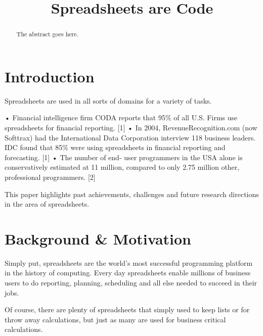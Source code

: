\documentclass[conference]{IEEEtran}
\begin{document}
\title{Spreadsheets are Code}

\author{
}


\maketitle

\begin{abstract}
The abstract goes here.
\end{abstract}

\IEEEpeerreviewmaketitle

\section{Introduction}
Spreadsheets are used in all sorts of domains for a variety of tasks.  

•	Financial intelligence firm CODA reports that 95\% of all U.S. Firms use spreadsheets for financial reporting. [1]
•	In 2004, RevenueRecognition.com (now Softtrax) had the International Data Corporation interview 118 business leaders. IDC found that 85\% were using spreadsheets in financial reporting and forecasting. [1]
•	The number of end- user programmers in the USA alone is conservatively estimated at 11 million, compared to only 2.75 million other, professional programmers. [2]



This paper highlights past achievements, challenges and future research directions in the area of spreadsheets. 


\section{Background \& Motivation}
Simply put, spreadsheets are the world's most successful programming platform in the history of computing. Every day spreadsheets enable millions of business users to do reporting, planning, scheduling and all else needed to succeed in their jobs. 

Of course, there are plenty of spreadsheets that simply used to keep lists or for throw away calculations, but just as many are used for business critical calculations.
\end{document}
